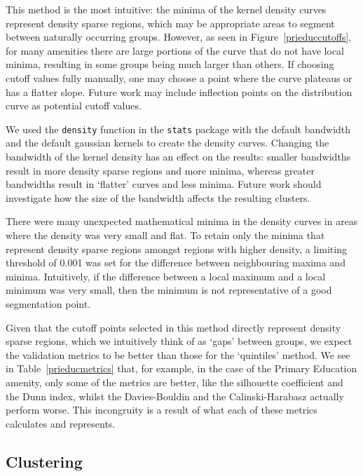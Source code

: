\documentclass[11pt, a4paper]{article}
\begin{document}
This method is the most intuitive: the minima of the kernel density curves represent density sparse regions, which may be appropriate areas to segment between naturally occurring groups. However, as seen in Figure~\ref{prieduccutoffs}, for many amenities there  are large  portions of the  curve  that do not have local minima, resulting in some groups being much larger than others. If choosing cutoff values fully manually, one may choose a point where the curve plateaus or has a flatter slope. Future work may include inflection points on the distribution curve as potential cutoff values.
\par
We used the \texttt{density} function in the \texttt{stats} package with the default bandwidth and the default gaussian kernels to create the density curves. Changing the bandwidth of the kernel density has an effect on the results: smaller bandwidths result in more density sparse regions and more minima, whereas greater bandwidths result in `flatter' curves and less minima. Future work should investigate how the size of the bandwidth affects the resulting clusters.
\par
There were many unexpected mathematical minima in the density curves in areas where the density was very small and flat. To retain only the minima that represent density sparse regions amongst regions with higher density, a limiting threshold of 0.001 was set for the difference between neighbouring maxima and minima. Intuitively, if the difference between a local maximum and a local minimum was very small, then the minimum is not representative of a good segmentation point.
\par
Given that the cutoff points selected in this method directly represent density sparse regions, which we intuitively think of as `gaps' between groups, we expect the validation metrics to be better than those for the `quintiles' method. We see in Table~\ref{prieducmetrics} that, for example, in the case of the Primary Education amenity, only some of the metrics are better, like the silhouette coefficient and the Dunn index, whilst the Davies-Bouldin and the Calinski-Harabasz actually perform worse. This incongruity is a result of what each of these metrics calculates and represents.







\subsection{Clustering}
\end{document}
